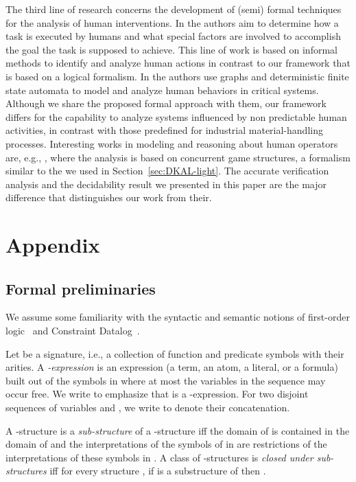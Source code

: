 \documentclass[conference]{llncs}
\begin{document}
{The third line of research concerns the development of (semi) formal techniques
for the analysis of human interventions.
In \cite{diaper90,suokas85} the authors aim to determine how a task is executed by
humans and what special factors are involved to accomplish the goal
the task is supposed to achieve. This line of work is based on informal methods 
to identify and analyze human actions in contrast to our framework that is based
on a logical formalism. 
In \cite{shin06} the authors use graphs and deterministic finite state automata
to model and analyze human behaviors in critical systems.
Although we share the proposed formal approach with them, our framework differs for the capability to analyze systems influenced by non predictable human activities, 
in contrast with those predefined for industrial material-handling processes.
Interesting works in modeling and reasoning about human operators 
are, e.g., \cite{yasmeen11,gunter09}, where the analysis is based on concurrent game structures, a formalism similar to the  we used in Section~\ref{sec:DKAL-light}.
The accurate verification analysis and the decidability result we presented in this paper 
are the major difference that distinguishes our work from their.








\section{Appendix}
\label{appx}
\subsection{Formal preliminaries}
\label{app:infprelim}

We assume some familiarity with the syntactic and semantic notions of
first-order logic~\cite{enderton} and Constraint
Datalog~\cite{constraintdatalog}.

Let  be a signature, i.e., a collection of function and predicate symbols with their arities. 
A \emph{-expression} is an expression (a term, an
atom, a literal, or a formula) built out of the symbols in 
where at most the variables in the sequence  may occur
free. 
We write  to emphasize that  is a
-expression. 
For two disjoint sequences of
variables  and , we write
 to denote their concatenation. 

A -structure  is a \emph{sub-structure} of a
-structure  iff the domain of  is
contained in the domain of  and the interpretations of
the symbols of  in  are restrictions of the
interpretations of these symbols in . A class
 of -structures is \emph{closed under
  sub-structures} iff for every structure , if  is a substructure of 
then . 

}
\end{document}
